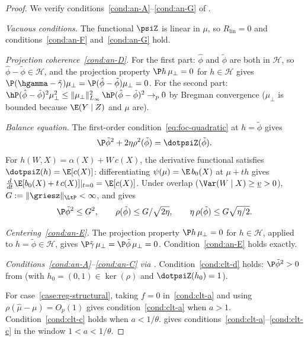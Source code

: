 \documentclass{article}
\begin{document}
\begin{proof}
We verify conditions~\ref{cond:an-A}--\ref{cond:an-G} of
.

\emph{Vacuous conditions.}
The functional $\psiZ$ is linear in $\mu$,
so $R_{\mathrm{lin}} = 0$
and conditions~\ref{cond:an-F} and~\ref{cond:an-G} hold.

\emph{Projection coherence~\ref{cond:an-D}.}
For the first part:
$\hat\phi$ and $\tilde\phi$
are both in $\mathcal{H}$,
so $\hat\phi - \tilde\phi \in \mathcal{H}$,
and the projection property
$\P h\,\mu_\perp = 0$ for $h \in \mathcal{H}$
gives
$\P(\hgamma - \tilde\gamma)\mu_\perp
  = \P(\hat\phi - \tilde\phi)\mu_\perp
  = 0$.
For the second part:
$\hP(\hat\phi - \tilde\phi)^2\mu_\perp^2
  \le \|\mu_\perp\|_{L_\infty}^2\,
      \hP(\hat\phi - \tilde\phi)^2
  \to_p 0$
by Bregman convergence
($\mu_\perp$ is bounded
because $\E(Y \mid Z)$ and $\mu$ are).

\emph{Balance equation.}
The first-order condition~\eqref{eq:foc-quadratic}
at $h = \tilde\phi$ gives
\begin{equation}\label{eq:regression-balance}
\P\tilde\phi^2 + 2\eta\rho^2(\tilde\phi)
  = \dotpsiZ(\tilde\phi).
\end{equation}
For $h(W,X) = \alpha(X) + W\, c(X)$,
the derivative functional satisfies
$\dotpsiZ(h) = \E[c(X)]$:
differentiating $\psi(\mu) = \E\, b_0(X)$
at $\mu + th$ gives
$\tfrac{d}{dt}\E[b_0(X) + t\, c(X)]|_{t=0}
  = \E[c(X)]$.
Under overlap ($\Var(W \mid X) \ge \underline{v} > 0$),
$G := \|\griesz\|_{\LtP} < \infty$,
and  gives
\begin{equation}\label{eq:regression-balance-bounds}
\P\tilde\phi^2 \le G^2,
\qquad
\rho(\tilde\phi) \le G/\sqrt{2\eta},
\qquad
\eta\,\rho(\tilde\phi) \le G\sqrt{\eta/2}.
\end{equation}

\emph{Centering~\ref{cond:an-E}.}
The projection property
$\P h\,\mu_\perp = 0$
for $h \in \mathcal{H}$,
applied to $h = \tilde\phi \in \mathcal{H}$,
gives $\P\tilde\gamma\,\mu_\perp
  = \P\tilde\phi\,\mu_\perp = 0$.
Condition~\ref{cond:an-E} holds exactly.

\emph{Conditions~\ref{cond:an-A}--\ref{cond:an-C}
  via .}
Condition~\ref{cond:clt-d} holds:
$\P\tilde\phi^2 > 0$
from 
(with $h_0 = (0, 1) \in \ker(\rho)$
and $\dotpsiZ(h_0) = 1$).

For case~\ref{case:reg-structural},
taking $f = 0$ in~\ref{cond:clt-a}
and using $\rho(\hat\mu-\mu) = O_p(1)$
gives condition~\ref{cond:clt-a} when $a > 1$.
Condition~\ref{cond:clt-c} holds when $a < 1/\theta$.
 gives
conditions~\ref{cond:clt-a}--\ref{cond:clt-c}
in the window $1 < a < 1/\theta$.


\end{proof}
\end{document}
